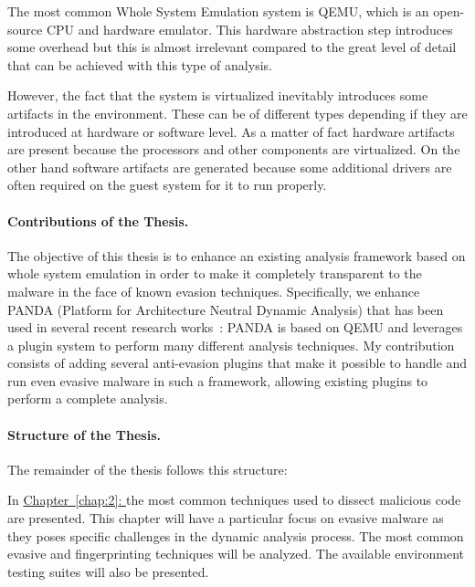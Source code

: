 The most common Whole System Emulation system is QEMU, which is an open-source CPU and hardware emulator. This hardware abstraction step introduces some overhead but this is almost irrelevant compared to the great level of detail that can be achieved with this type of analysis. 

However, the fact that the system is virtualized inevitably introduces some artifacts in the environment. These can be of different types depending if they are introduced at hardware or software level. As a matter of fact hardware artifacts are present because the processors and other components are virtualized. On the other hand software artifacts are generated because some additional drivers are often required on the guest system for it to run properly. 

\paragraph{Contributions of the Thesis.}
The objective of this thesis is to enhance an existing analysis framework based on whole system emulation in order to make it completely transparent to the malware in the face of known evasion techniques. Specifically, we enhance PANDA (Platform for Architecture Neutral Dynamic Analysis) that has been used in several recent research works~\cite{}: PANDA is based on QEMU and leverages a plugin system to perform many different analysis techniques.  My contribution consists of adding several anti-evasion plugins that make it possible to handle and run even evasive malware in such a framework, allowing existing plugins to perform a complete analysis.


\medskip
\paragraph{Structure of the Thesis.} The remainder of the thesis follows this structure:

\medskip
In \hyperref[chap:2]{Chapter~\ref*{chap:2}: } the most common techniques used to dissect malicious code are presented. This chapter will have a particular focus on evasive malware as they poses specific challenges in the dynamic analysis process. The most common evasive and fingerprinting techniques will be analyzed. The available environment testing suites will also be presented. 



